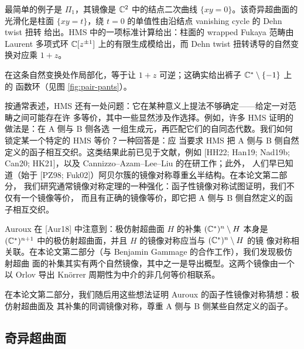 最简单的例子是 $\Pi_1$，其镜像是 $\mathbb{C}^2$ 中的结点二次曲线 $\{xy=0\}$。该奇异超曲面的
光滑化是柱面 $\{xy=t\}$，绕 $t=0$ 的单值性由沿结点 vanishing cycle 的 Dehn twist 扭转
给出。HMS 中的一项标准计算给出：柱面的 wrapped Fukaya 范畴由 Laurent 多项式环
$\mathbb{C}[z^{\pm1}]$ 上的有限生成模给出，而 Dehn twist 扭转诱导的自然变换对应乘 $1+z$。

在这条自然变换处作局部化，等于让 $1+z$ 可逆；这确实给出裤子 $\mathbb{C}^*\setminus\{-1\}$ 上的
函数环（见图 \ref{fig:pair-pants}）。


按通常表述，HMS 还有一处问题：它在某种意义上提法不够确定——给定一对范畴之间可能存在许
多等价，其中一些显然涉及作选择。例如，许多 HMS 证明的做法是：在 A 侧与 B 侧各选
一组生成元，再匹配它们的自同态代数。我们如何锁定某一个特定的 HMS 等价？一种回答是：应
当要求 HMS 把 A 侧与 B 侧自然定义的函子相互交织。这类结果此前已见于文献，例如
[HH22; Han19; Nad19b; Can20; HK21]，以及 Cannizzo--Azam--Lee--Liu 的在研工作；此外，
人们早已知道（始于 [PZ98; Fuk02]）阿贝尔簇的镜像对称尊重幺半结构。在本论文第二部分，
我们研究通常镜像对称定理的一种强化：函子性镜像对称试图证明，我们不仅有一个镜像等价，
而且有正确的镜像等价，即它把 A 侧与 B 侧自然定义的函子相互交织。


Auroux 在 [Aur18] 中注意到：极仿射超曲面 $H$ 的补集 $(\mathbb{C}^*)^n\setminus H$ 本身是
$(\mathbb{C}^*)^{n+1}$ 中的极仿射超曲面，并且 $H$ 的镜像对称应当与 $(\mathbb{C}^*)^n\setminus H$ 的镜
像对称相关联。在本论文第二部分（与 Benjamin Gammage 的合作工作），我们发现极仿射超曲
面的补集其实有两个自然镜像，其中之一是导出概型。这两个镜像由一个以 Orlov 导出
Kn{\"o}rrer 周期性为中介的非几何等价相联系。

在本论文第二部分，我们随后用这些想法证明 Auroux 的函子性镜像对称猜想：极仿射超曲面及
其补集的同调镜像对称，尊重 A 侧与 B 侧某些自然定义的函子。

\subsection{奇异超曲面}

